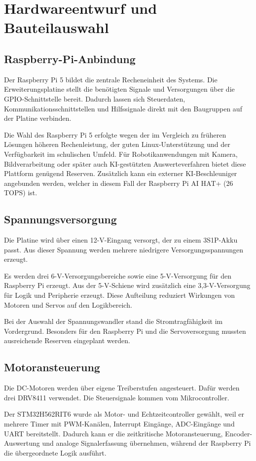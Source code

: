 \section{Hardwareentwurf und Bauteilauswahl}
\subsection{Raspberry-Pi-Anbindung}
Der Raspberry Pi 5 bildet die zentrale Recheneinheit des Systems. Die Erweiterungsplatine stellt die benötigten Signale und Versorgungen über die GPIO-Schnittstelle bereit. Dadurch lassen sich Steuerdaten, Kommunikationsschnittstellen und Hilfssignale direkt mit den Baugruppen auf der Platine verbinden.

Die Wahl des Raspberry Pi 5 erfolgte wegen der im Vergleich zu früheren Lösungen höheren Rechenleistung, der guten Linux-Unterstützung und der Verfügbarkeit im schulischen Umfeld. Für Robotikanwendungen mit Kamera, Bildverarbeitung oder später auch KI-gestützten Auswerteverfahren bietet diese Plattform genügend Reserven. Zusätzlich kann ein externer KI-Beschleuniger angebunden werden, welcher in diesem Fall der Raspberry Pi AI HAT+ (26 TOPS) ist.

\subsection{Spannungsversorgung}
Die Platine wird über einen 12-V-Eingang versorgt, der zu einem 3S1P-Akku passt. Aus dieser Spannung werden mehrere niedrigere Versorgungsspannungen erzeugt.

Es werden drei 6-V-Versorgungsbereiche sowie eine 5-V-Versorgung für den Raspberry Pi erzeugt. Aus der 5-V-Schiene wird zusätzlich eine 3,3-V-Versorgung für Logik und Peripherie erzeugt. Diese Aufteilung reduziert Wirkungen von Motoren und Servos auf den Logikbereich.

Bei der Auswahl der Spannungswandler stand die Stromtragfähigkeit im Vordergrund. Besonders für den Raspberry Pi und die Servoversorgung mussten ausreichende Reserven eingeplant werden.

\subsection{Motoransteuerung}
Die DC-Motoren werden über eigene Treiberstufen angesteuert. Dafür werden drei DRV8411 verwendet. Die Steuersignale kommen vom Mikrocontroller.

Der STM32H562RIT6 wurde als Motor- und Echtzeitcontroller gewählt, weil er mehrere Timer mit PWM-Kanälen, Interrupt Eingänge, ADC-Eingänge und UART bereitstellt. Dadurch kann er die zeitkritische Motoransteuerung, Encoder-Auswertung und analoge Signalerfassung übernehmen, während der Raspberry Pi die übergeordnete Logik ausführt.

